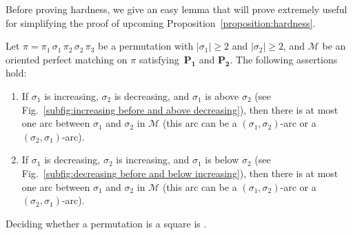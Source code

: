 \documentclass[a4paper]{llncs}
\begin{document}
Before proving hardness, we give an easy lemma that will prove extremely
useful for simplifying the proof of upcoming
Proposition~\ref{proposition:hardness}.

\begin{lemma}
  \label{lemma:at most one edge monotone}
  Let $\pi = \pi_1 \, \sigma_1 \, \pi_2 \, \sigma_2 \, \pi_3$
  be a permutation with $|\sigma_1| \geq 2$ and $|\sigma_2| \geq 2$,
  and $\mathcal{M}$ be an oriented perfect matching on $\pi$
  satisfying~$\mathbf{P_1}$ and $\mathbf{P_2}$.
  The following assertions hold:
  \begin{enumerate}
    \item
    If $\sigma_1$ is increasing, $\sigma_2$ is decreasing, and
    $\sigma_1$ is above $\sigma_2$
    (see Fig.~\ref{subfig:increasing before and above decreasing}),
    then there is at most one arc between $\sigma_1$ and
    $\sigma_2$ in $\mathcal{M}$ (this arc can be a
    $(\sigma_1, \sigma_2)$-arc or a $(\sigma_2, \sigma_1)$-arc).
    \item
    If $\sigma_1$ is decreasing, $\sigma_2$ is increasing, and $\sigma_1$
    is below $\sigma_2$
    (see Fig.~\ref{subfig:decreasing before and below increasing}),
    then there is at most one arc between $\sigma_1$ and
    $\sigma_2$ in $\mathcal{M}$ (this arc can be a
    $(\sigma_1, \sigma_2)$-arc or a $(\sigma_2, \sigma_1)$-arc).
  \end{enumerate}
\end{lemma}

\begin{proposition}
  \label{proposition:hardness}
  Deciding whether a permutation is a square is \NPC.
\end{proposition}
\end{document}
